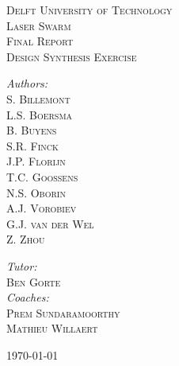 \begin{titlepage}
\begin{center}

\textsc{\LARGE Delft University of Technology}\\[1.5cm]

\textsc{\Huge Laser Swarm}\\[0.5cm]
\textsc{\small Final Report}\\[1.5cm]
\textsc{\large Design Synthesis Exercise}\\[2.5cm]

\begin{minipage}{0.4\textwidth}
\begin{flushleft} \large
\emph{Authors:}\\
\textsc{S. Billemont\\
L.S. Boersma\\
B. Buyens\\
S.R. Finck\\
J.P. Florijn\\
T.C. Goossens\\
N.S. Oborin\\
A.J. Vorobiev\\
G.J. van der Wel\\
Z. Zhou\\}
\end{flushleft}
\end{minipage}
\begin{minipage}{0.4\textwidth}
\begin{flushright}
\emph{Tutor:}\\
\textsc{Ben Gorte}\\[1cm]
\emph{Coaches:}\\
\textsc{Prem Sundaramoorthy\\
Mathieu Willaert}
\end{flushright}
\end{minipage}
\vfill

\today
\end{center}
\end{titlepage}